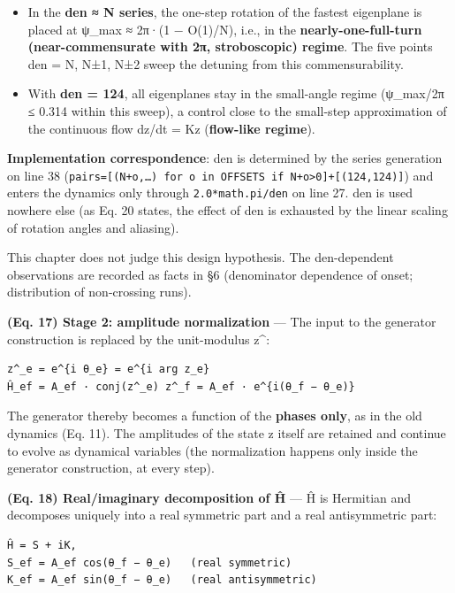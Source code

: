 \documentclass[
  a4paper,
]{ltjsarticle}
\providecommand{\tightlist}{%
  \setlength{\itemsep}{0pt}\setlength{\parskip}{0pt}}
\begin{document}
\begin{itemize}
\tightlist
\item
  In the \textbf{den ≈ N series}, the one-step rotation of the fastest
  eigenplane is placed at ψ\_max ≈ 2π·(1 − O(1)/N), i.e., in the
  \textbf{nearly-one-full-turn (near-commensurate with 2π, stroboscopic)
  regime}. The five points den = N, N±1, N±2 sweep the detuning from
  this commensurability.
\item
  With \textbf{den = 124}, all eigenplanes stay in the small-angle
  regime (ψ\_max/2π ≤ 0.314 within this sweep), a control close to the
  small-step approximation of the continuous flow dz/dt = Kz
  (\textbf{flow-like regime}).
\end{itemize}

\textbf{Implementation correspondence}: den is determined by the series
generation on line 38
(\texttt{pairs={[}(N+o,…)\ for\ o\ in\ OFFSETS\ if\ N+o\textgreater{}0{]}+{[}(124,\textquotesingle{}124\textquotesingle{}){]}})
and enters the dynamics only through \texttt{2.0*math.pi/den} on line
27. den is used nowhere else (as Eq. 20 states, the effect of den is
exhausted by the linear scaling of rotation angles and aliasing).

This chapter does not judge this design hypothesis. The den-dependent
observations are recorded as facts in §6 (denominator dependence of
onset; distribution of non-crossing runs).

\textbf{(Eq. 17) Stage 2: amplitude normalization} --- The input to the
generator construction is replaced by the unit-modulus z\^{}:

\begin{verbatim}
z^_e = e^{i θ_e} = e^{i arg z_e}
Ĥ_ef = A_ef · conj(z^_e) z^_f = A_ef · e^{i(θ_f − θ_e)}
\end{verbatim}

The generator thereby becomes a function of the \textbf{phases only}, as
in the old dynamics (Eq. 11). The amplitudes of the state z itself are
retained and continue to evolve as dynamical variables (the
normalization happens only inside the generator construction, at every
step).

\textbf{(Eq. 18) Real/imaginary decomposition of Ĥ} --- Ĥ is Hermitian
and decomposes uniquely into a real symmetric part and a real
antisymmetric part:

\begin{verbatim}
Ĥ = S + iK,
S_ef = A_ef cos(θ_f − θ_e)   (real symmetric)
K_ef = A_ef sin(θ_f − θ_e)   (real antisymmetric)
\end{verbatim}
\end{document}
